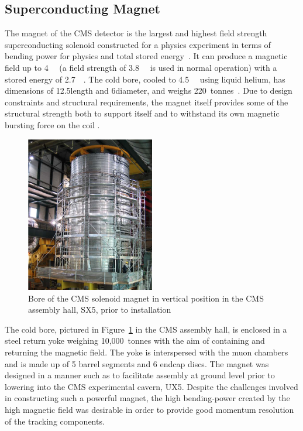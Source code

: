 \subsection{Superconducting Magnet}
\label{ss:Magnet}
The magnet of the CMS detector is the largest and highest field strength superconducting solenoid constructed
for a physics experiment in terms of bending power for physics and total stored energy~\cite{CMS_experiment}.
It can produce a magnetic field up to 4~\tesla~ (a field strength of 3.8~\tesla~ is used in normal operation)
with a stored energy of 2.7~\giga\joule~\cite{CMS_TDR1}. The cold bore, cooled to 4.5~\kelvin~ using liquid
helium, has dimensions of 12.5\m length and 6\m diameter, and weighs
220~tonnes~\cite{Cryogenic_System_for_Superconducting_Solenoid}.
Due to design constraints and structural requirements, the magnet itself provides some of the structural
strength both to support itself and to withstand its own magnetic bursting force on the coil
\cite{CMS_experiment}.

\begin{figure}[hbtp]
   \centering
     \includegraphics[width=0.5\textwidth]{Chapters/04_Detector/Images/Cold_mass.png}\hfill
     \caption[Bore of the CMS solenoid magnet in vertical position in the CMS assembly hall, SX5.]{Bore of the
     CMS solenoid magnet in vertical position in the CMS assembly hall, SX5, prior to installation \cite{CMS_experiment}}
     \label{fig:CMS_magnet_cold_bore}
\end{figure}
 
The cold bore, pictured in Figure~\ref{fig:CMS_magnet_cold_bore} in the CMS assembly hall, is enclosed in a
steel return yoke weighing 10,000~tonnes with the aim of containing and returning the magnetic field. The yoke
is interspersed with the muon chambers and is made up of 5 barrel segments and 6 endcap discs. The magnet was
designed in a manner such as to facilitate assembly at ground level prior to lowering into the CMS
experimental cavern, UX5. Despite the challenges involved in constructing such a powerful magnet, the high
bending-power created by the high magnetic field was desirable in order to provide good momentum
resolution of the tracking components.

